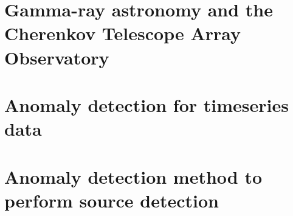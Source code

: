 \documentclass[oneside,openright,titlepage,numbers=noenddot,headinclude,footinclude=true,cleardoublepage=empty,listof=totoc,paper=a4,fontsize=11pt,american,BCOR=5mm]{scrreprt}
\begin{document}
  \frenchspacing
  \raggedbottom
  
  \pagestyle{plain}
  
  \singlespacing
  
  
  
  
  
  
  \cleardoublepage
  \pagestyle{scrheadings}
  \onehalfspacing
  
  
  \chapter{Gamma-ray astronomy and the Cherenkov Telescope Array Observatory}\label{c:Background}
  

  \chapter{Anomaly detection for timeseries data}\label{c:Background-2}
  
  
  \chapter{Anomaly detection method to perform source detection}\label{c:Contribution-1}
  

  
\end{document}
